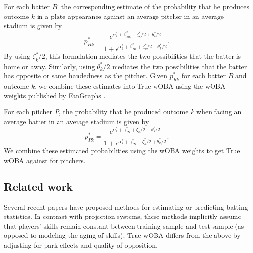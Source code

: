 \documentclass[11pt]{article}
\begin{document}
For each batter $B$, the corresponding estimate of the probability that he
produces outcome $k$ in a plate appearance against an average pitcher in an
average stadium is given by
$$p_{Bk}^* = \frac{e^{\alpha_k^* + \beta_{Bk}^* + \zeta_k^*/2 + \theta_k^*/2}}
    {1 + e^{\alpha_k^* + \beta_{Bk}^* + \zeta_k^*/2 + \theta_k^*/2}}.$$
By using $\zeta_k^*/2$, this formulation mediates the two possibilities that
the batter is home or away. Similarly, using $\theta_k^*/2$ mediates the two
possibilities that the batter has opposite or same handedness as the pitcher.
Given $p_{Bk}^*$ for each batter $B$ and outcome $k$, we combine these
estimates into True wOBA using the wOBA weights published by FanGraphs
\citep{wOBAweights}.

For each pitcher $P$, the probability that he produced outcome $k$ when facing
an average batter in an average stadium is given by
$$p_{Pk}^* = \frac{e^{\alpha_k^* + \gamma_{Pk}^* + \zeta_k^*/2 + \theta_k^*/2}}
    {1 + e^{\alpha_k^* + \gamma_{Pk}^* + \zeta_k^*/2 + \theta_k^*/2}}.$$
We combine these estimated probabilities using the wOBA weights to get True
wOBA against for pitchers.

\subsection{Related work}

Several recent papers \citep{Brown08, Null09, Neal.etal10, Albert15} have
proposed methods for estimating or predicting batting statistics. In contrast
with projection systems, these methods implicitly assume that players' skills
remain constant between training sample and test sample (as opposed to
modeling the aging of skills). True wOBA differs from the above by adjusting
for park effects and quality of opposition.
\end{document}
